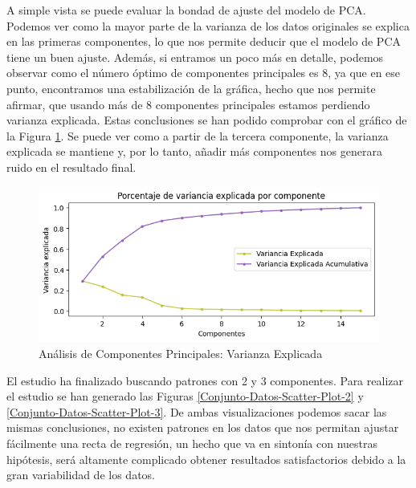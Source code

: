 A simple vista se puede evaluar la bondad de ajuste del modelo de PCA. Podemos ver como la mayor parte de la varianza de los datos originales se explica en las primeras componentes, lo que nos permite deducir que el modelo de PCA tiene un buen ajuste. Además, si entramos un poco más en detalle, podemos observar como el número óptimo de componentes principales es 8, ya que en ese punto, encontramos una estabilización de la gráfica, hecho que nos permite afirmar, que usando más de 8 componentes principales estamos perdiendo varianza explicada. Estas conclusiones se han podido comprobar con el gráfico de la Figura \ref{Conjunto-Datos-Varianza-Explicada}. Se puede ver como a partir de la tercera componente, la varianza explicada se mantiene y, por lo tanto, añadir más componentes nos generara ruido en el resultado final.

\begin{figure}[H]
    \centering
    \includegraphics[width=\figsize]{images/varianzaExplicada.png}
    \caption{Análisis de Componentes Principales: Varianza Explicada}
    \label{Conjunto-Datos-Varianza-Explicada}
\end{figure}

El estudio ha finalizado buscando patrones con 2 y 3 componentes. Para realizar el estudio se han generado las Figuras \ref{Conjunto-Datos-Scatter-Plot-2} y \ref{Conjunto-Datos-Scatter-Plot-3}. De ambas visualizaciones podemos sacar las mismas conclusiones, no existen patrones en los datos que nos permitan ajustar fácilmente una recta de regresión, un hecho que va en sintonía con nuestras hipótesis, será altamente complicado obtener resultados satisfactorios debido a la gran variabilidad de los datos.


